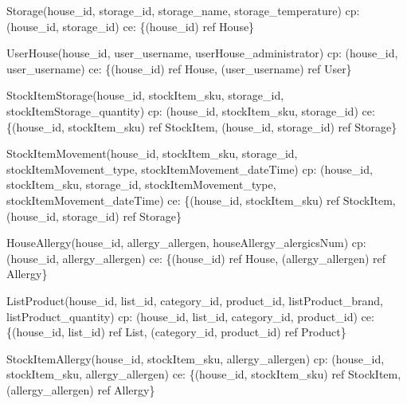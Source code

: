{\begin{description}
		\item Storage(house\_id, storage\_id, storage\_name, storage\_temperature)  \newline
		\acrshort{cp}:(house\_id, storage\_id) \newline
		\acrshort{ce}: \{(house\_id) ref House\}
		
		\item UserHouse(house\_id, user\_username, userHouse\_administrator) \newline
		\acrshort{cp}: (house\_id, user\_username) \newline
		\acrshort{ce}: \{(house\_id) ref House, (user\_username) ref User\}
		
		\item StockItemStorage(house\_id, stockItem\_sku, storage\_id, stockItemStorage\_quantity) \newline
		\acrshort{cp}: (house\_id, stockItem\_sku, storage\_id) \newline
		\acrshort{ce}: \{(house\_id, stockItem\_sku) ref StockItem, (house\_id, storage\_id) ref Storage\}
		
		\item StockItemMovement(house\_id, stockItem\_sku, storage\_id, stockItemMovement\_type, \newline stockItemMovement\_dateTime) \newline
		\acrshort{cp}: (house\_id, stockItem\_sku, storage\_id, stockItemMovement\_type, \newline stockItemMovement\_dateTime) \newline
		\acrshort{ce}: \{(house\_id, stockItem\_sku) ref StockItem, (house\_id, storage\_id) ref Storage\}
		
		\item HouseAllergy(house\_id, allergy\_allergen, houseAllergy\_alergicsNum) \newline
		\acrshort{cp}: (house\_id, allergy\_allergen) \newline
		\acrshort{ce}: \{(house\_id) ref House, (allergy\_allergen) ref Allergy\}
		
		\item ListProduct(house\_id, list\_id, category\_id, product\_id, listProduct\_brand, listProduct\_quantity) \newline
		\acrshort{cp}: (house\_id, list\_id, category\_id, product\_id) \newline
		\acrshort{ce}: \{(house\_id, list\_id) ref List, (category\_id, product\_id) ref Product\}
		
		\item StockItemAllergy(house\_id, stockItem\_sku, allergy\_allergen) \newline
		\acrshort{cp}: (house\_id, stockItem\_sku, allergy\_allergen) \newline
		\acrshort{ce}: \{(house\_id, stockItem\_sku) ref StockItem, (allergy\_allergen) ref Allergy\}
		

\end{description}}

